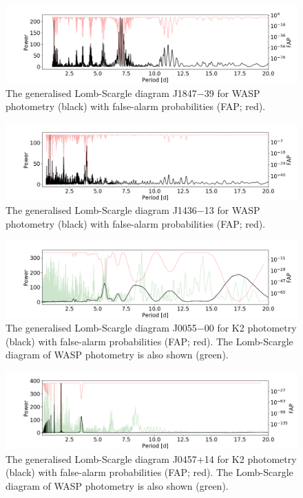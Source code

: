 \begin{figure}
    \centering
    \includegraphics[scale=0.4]{Appendix/Peridograms/J1847+39_period.png}
    \caption{The generalised Lomb-Scargle diagram J1847$-$39 for WASP photometry (black) with false-alarm probabilities (FAP; red). }
    \label{appendix:fig:J1847+39_lomb}
\end{figure}

\begin{figure}
    \centering
    \includegraphics[scale=0.4]{Appendix/Peridograms/J1436-13_period.png}
    \caption{The generalised Lomb-Scargle diagram J1436$-$13 for WASP photometry (black) with false-alarm probabilities (FAP; red). }
    \label{appendix:fig:J1436-13_lomb}
\end{figure}

\begin{figure}
    \centering
    \includegraphics[scale=0.4]{Appendix/Peridograms/J0055-00_period.png}
    \caption{The generalised Lomb-Scargle diagram J0055$-$00 for K2 photometry (black) with false-alarm probabilities (FAP; red). The Lomb-Scargle diagram of WASP photometry is also shown (green).  }
    \label{appendix:fig:J0055-00_lomb}
\end{figure}

\begin{figure}
    \centering
    \includegraphics[scale=0.4]{Appendix/Peridograms/J0457+14_period.png}
    \caption{The generalised Lomb-Scargle diagram J0457$+$14 for K2 photometry (black) with false-alarm probabilities (FAP; red). The Lomb-Scargle diagram of WASP photometry is also shown (green).  }
    \label{appendix:fig:J0457+14_lomb}
\end{figure}

